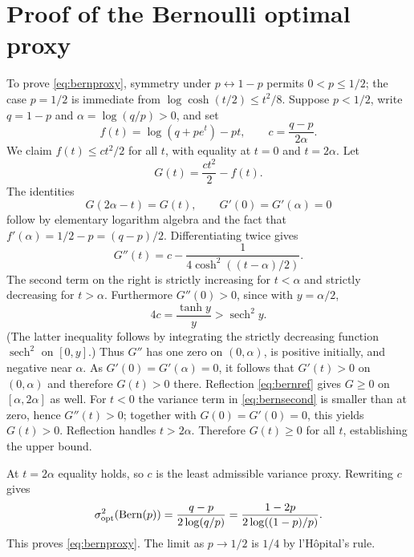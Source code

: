 \documentclass[11pt,a4paper]{article}
\begin{document}
\section{Proof of the Bernoulli optimal proxy}\label{app:bernoulli}
To prove \eqref{eq:bernproxy}, symmetry under $p\leftrightarrow1-p$ permits $0<p\le1/2$; the case $p=1/2$ is immediate from $\log\cosh(t/2)\le t^2/8$. Suppose $p<1/2$, write $q=1-p$ and $\alpha=\log(q/p)>0$, and set
\[
 f(t)=\log(q+pe^t)-pt,\qquad
 c=\frac{q-p}{2\alpha}.
\]
We claim $f(t)\le ct^2/2$ for all $t$, with equality at $t=0$ and $t=2\alpha$. Let
\[
 G(t)=\frac{ct^2}{2}-f(t).
\]
The identities
\begin{equation}\label{eq:bernref}
 G(2\alpha-t)=G(t),\qquad
 G'(0)=G'(\alpha)=0
\end{equation}
follow by elementary logarithm algebra and the fact that $f'(\alpha)=1/2-p=(q-p)/2$. Differentiating twice gives
\begin{equation}\label{eq:bernsecond}
 G''(t)=c-\frac1{4\cosh^2((t-\alpha)/2)}.
\end{equation}
The second term on the right is strictly increasing for $t<\alpha$ and strictly decreasing for $t>\alpha$. Furthermore $G''(0)>0$, since with $y=\alpha/2$,
\[
 4c=\frac{\tanh y}{y}>\operatorname{sech}^2 y.
\]
(The latter inequality follows by integrating the strictly decreasing function $\operatorname{sech}^2$ on $[0,y]$.) Thus $G''$ has one zero on $(0,\alpha)$, is positive initially, and negative near $\alpha$. As $G'(0)=G'(\alpha)=0$, it follows that $G'(t)>0$ on $(0,\alpha)$ and therefore $G(t)>0$ there. Reflection \eqref{eq:bernref} gives $G\ge0$ on $[\alpha,2\alpha]$ as well. For $t<0$ the variance term in \eqref{eq:bernsecond} is smaller than at zero, hence $G''(t)>0$; together with $G(0)=G'(0)=0$, this yields $G(t)>0$. Reflection handles $t>2\alpha$. Therefore $G(t)\ge0$ for all $t$, establishing the upper bound.

At $t=2\alpha$ equality holds, so $c$ is the least admissible variance proxy. Rewriting $c$ gives
\[
 \sigma^2_{\mathrm{opt}}(\operatorname{Bern}(p))
 =\frac{q-p}{2\log(q/p)}=
 \frac{1-2p}{2\log((1-p)/p)}.
\]
This proves \eqref{eq:bernproxy}. The limit as $p\to1/2$ is $1/4$ by l'H\^opital's rule.
\end{document}
